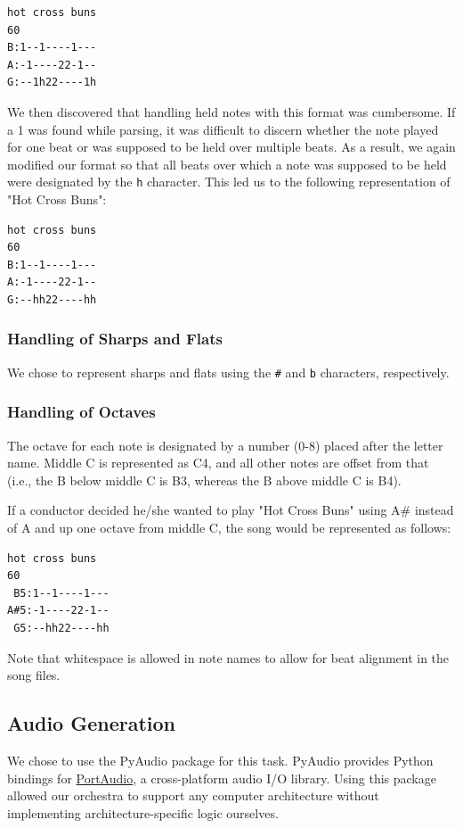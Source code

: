 \documentclass[12pt, letterpaper]{article}
\begin{document}
\begin{verbatim}
hot cross buns
60
B:1--1----1---
A:-1----22-1--
G:--1h22----1h
\end{verbatim}

We then discovered that handling held notes with this format was cumbersome. If a 1 was found while
parsing, it was difficult to discern whether the note played for one beat or was supposed to be held
over multiple beats. As a result, we again modified our format so that all beats over which a note
was supposed to be held were designated by the \texttt{h} character. This led us to the following
representation of "Hot Cross Buns":

\begin{verbatim}
hot cross buns
60
B:1--1----1---
A:-1----22-1--
G:--hh22----hh
\end{verbatim}
            
\subsubsection{Handling of Sharps and Flats}
We chose to represent sharps and flats using the \texttt{\#} and \texttt{b} characters,
respectively.

\subsubsection{Handling of Octaves}
The octave for each note is designated by a number (0-8) placed after the letter name. Middle C is
represented as C4, and all other notes are offset from that (i.e., the B below middle C is B3,
whereas the B above middle C is B4).

If a conductor decided he/she wanted to play "Hot Cross Buns" using A\# instead of A and up one
octave from middle C, the song would be represented as follows:

\begin{verbatim}
hot cross buns
60
 B5:1--1----1---
A#5:-1----22-1--
 G5:--hh22----hh
\end{verbatim}

Note that whitespace is allowed in note names to allow for beat alignment in the song files.

\subsection{Audio Generation}
We chose to use the PyAudio package for this task. PyAudio provides Python bindings for
\href{http://www.portaudio.com/}{PortAudio}, a cross-platform audio I/O library. Using this package
allowed our orchestra to support any computer architecture without implementing
architecture-specific logic ourselves.
\end{document}
